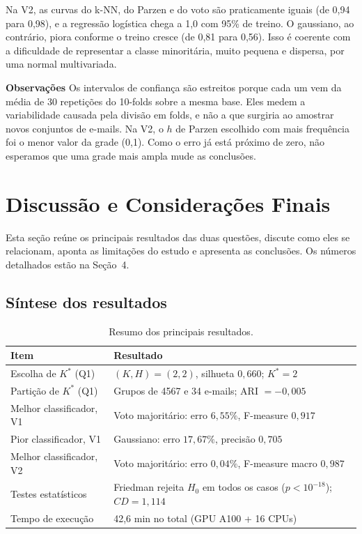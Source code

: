 \documentclass[12pt,reqno]{amsart}
\begin{document}
Na V2, as curvas do k-NN, do Parzen e do voto são praticamente iguais (de 0,94 para 0,98), e a
regressão logística chega a 1,0 com 95\% de treino. O gaussiano, ao contrário, piora conforme o
treino cresce (de 0,81 para 0,56). Isso é coerente com a dificuldade de representar a classe
minoritária, muito pequena e dispersa, por uma normal multivariada.

\noindent \textbf{Observações}
Os intervalos de confiança são estreitos porque cada um vem da média de 30 repetições do
10-folds sobre a mesma base. Eles medem a variabilidade causada pela divisão em folds, e não a
que surgiria ao amostrar novos conjuntos de e-mails. Na V2, o $h$ de Parzen escolhido com mais
frequência foi o menor valor da grade (0,1). Como o erro já está próximo de zero, não esperamos
que uma grade mais ampla mude as conclusões.

\section{Discussão e Considerações Finais}

Esta seção reúne os principais resultados das duas questões, discute como eles se relacionam,
aponta as limitações do estudo e apresenta as conclusões. Os números detalhados estão na
Seção~4.

\clearpage
\subsection{Síntese dos resultados}\mbox{}

\begin{table}[H]
\centering
\caption{Resumo dos principais resultados.}
\label{tab:sintese}
\small
\begin{tabular}{p{}p{}}
\toprule
Item & Resultado \\
\midrule
Escolha de $K^*$ (Q1) & $(K,H)=(2,2)$, silhueta $0{,}660$; $K^*=2$ \\
Partição de $K^*$ (Q1) & Grupos de 4567 e 34 e-mails; ARI $=-0{,}005$ \\
Melhor classificador, V1 & Voto majoritário: erro $6{,}55\%$, F-measure $0{,}917$ \\
Pior classificador, V1 & Gaussiano: erro $17{,}67\%$, precisão $0{,}705$ \\
Melhor classificador, V2 & Voto majoritário: erro $0{,}04\%$, F-measure macro $0{,}987$ \\
Testes estatísticos & Friedman rejeita $H_0$ em todos os casos ($p<10^{-18}$); $CD=1{,}114$ \\
Tempo de execução & 42,6 min no total (GPU A100 + 16 CPUs) \\
\bottomrule
\end{tabular}
\end{table}
\end{document}
